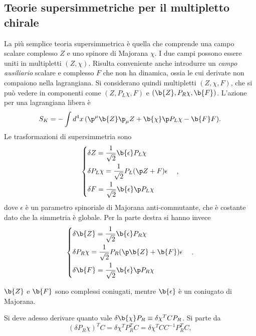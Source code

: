 \subsection{Teorie supersimmetriche per il multipletto chirale}
La più semplice teoria supersimmetrica è quella che comprende una campo scalare complesso $Z$ e uno spinore di Majorana $\chi$. I due campi possono essere uniti in multipletti $(Z,\chi)$. Risulta conveniente anche introdurre un \emph{campo ausiliario} scalare e complesso $F$ che non ha dinamica, ossia le cui derivate non compaiono nella lagrangiana. Si considerano quindi multipletti $(Z,\chi,F)$, che si può vedere in componenti come $(Z,P_L\chi,F)$ e $(\b{Z},P_R\chi,\b{F})$. L'azione per una lagrangiana libera è 
\begin{equation}
    S_K = -\int d^4x\,(\p^\mu\b{Z}\p_\mu Z + \b{\chi}\sl{\p}P_L\chi - \b{F}F).
\end{equation}
Le trasformazioni di supersimmetria sono 
\begin{equation}
    \begin{cases}
        \delta Z = \dfrac{1}{\sqrt{2}}\b{\epsilon}P_L\chi \\[2ex]
        \delta P_L\chi = \dfrac{1}{\sqrt{2}}P_L(\sl{\p}Z + F)\epsilon \\[2ex]
        \delta F = \dfrac{1}{\sqrt{2}}\b{\epsilon}\sl{\p}P_L\chi
    \end{cases},
\end{equation}
dove $\epsilon$ è un parametro spinoriale di Majorana anti-commutante, che è costante dato che la simmetria è globale. Per la parte destra si hanno invece 
\begin{equation}
    \begin{cases}
        \delta \b{Z} = \dfrac{1}{\sqrt{2}}\b{\epsilon}P_R\chi \\[2ex]
        \delta P_R\chi = \dfrac{1}{\sqrt{2}}P_R(\sl{\p}\b{Z} + \b{F})\epsilon \\[2ex]
        \delta \b{F} = \dfrac{1}{\sqrt{2}}\b{\epsilon}\sl{\p}P_R\chi
    \end{cases}.
\end{equation}
\begin{notz}
    $\b{Z}$ e $\b{F}$ sono complessi coniugati, mentre $\b{\epsilon}$ è un coniugato di Majorana.
\end{notz}
Si deve adesso derivare quanto vale $\delta\b{\chi}P_R \equiv \delta \chi^TCP_R$. Si parte da
\begin{equation}
    (\delta P_R\chi)^TC = \delta \chi^TP_R^TC = \delta \chi^TCC^{-1}P_R^TC,
\end{equation} 
